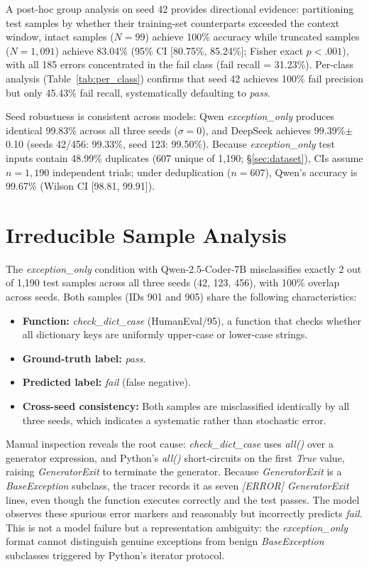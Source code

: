 A post-hoc group analysis on seed 42 provides directional evidence: partitioning test samples by whether their training-set counterparts exceeded the context window, intact samples ($N{=}99$) achieve 100\% accuracy while truncated samples ($N{=}1{,}091$) achieve 83.04\% (95\% CI [80.75\%, 85.24\%]; Fisher exact $p{<}.001$), with all 185 errors concentrated in the fail class (fail recall = 31.23\%).
Per-class analysis (Table~\ref{tab:per_class}) confirms that seed 42 achieves 100\% fail precision but only 45.43\% fail recall, systematically defaulting to \textit{pass}.

Seed robustness is consistent across models: Qwen \textit{exception\_only} produces identical 99.83\% across all three seeds ($\sigma{=}0$), and DeepSeek achieves 99.39\%$\pm$0.10 (seeds 42/456: 99.33\%, seed 123: 99.50\%).
Because \textit{exception\_only} test inputs contain 48.99\% duplicates (607 unique of 1,190; \S\ref{sec:dataset}), CIs assume $n{=}1{,}190$ independent trials; under deduplication ($n{=}607$), Qwen's accuracy is 99.67\% (Wilson CI [98.81, 99.91]).

\section{Irreducible Sample Analysis}
\label{sec:irreducible}

The \textit{exception\_only} condition with Qwen-2.5-Coder-7B misclassifies exactly 2 out of 1,190 test samples across all three seeds (42, 123, 456), with 100\% overlap across seeds.
Both samples (IDs 901 and 905) share the following characteristics:

\begin{itemize}
\item \textbf{Function:} \textit{check\_dict\_case} (HumanEval/95), a function that checks whether all dictionary keys are uniformly upper-case or lower-case strings.
\item \textbf{Ground-truth label:} \textit{pass}.
\item \textbf{Predicted label:} \textit{fail} (false negative).
\item \textbf{Cross-seed consistency:} Both samples are misclassified identically by all three seeds, which indicates a systematic rather than stochastic error.
\end{itemize}

Manual inspection reveals the root cause: \textit{check\_dict\_case} uses \textit{all()} over a generator expression, and Python's \textit{all()} short-circuits on the first \textit{True} value, raising \textit{GeneratorExit} to terminate the generator.
Because \textit{GeneratorExit} is a \textit{BaseException} subclass, the tracer records it as seven \textit{[ERROR] GeneratorExit} lines, even though the function executes correctly and the test passes.
The model observes these spurious error markers and reasonably but incorrectly predicts \textit{fail}.
This is not a model failure but a representation ambiguity: the \textit{exception\_only} format cannot distinguish genuine exceptions from benign \textit{BaseException} subclasses triggered by Python's iterator protocol.

